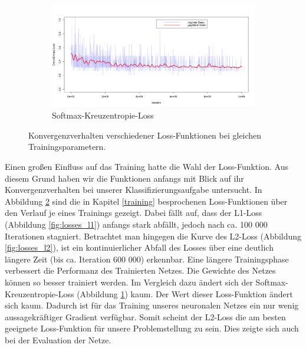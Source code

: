 \begin{figure}[htb!]
\begin{subfigure}[t]{0.49\textwidth}
	\end{subfigure}
	\hfill
	\begin{subfigure}[t]{0.49\textwidth}
		\includegraphics[width=\textwidth]{pics/losses/ce_loss.png}
		\caption{Softmax-Kreuzentropie-Loss}
		\label{fig:losses_ce}
	\end{subfigure}		
	\caption{Konvergenzverhalten verschiedener Loss-Funktionen bei gleichen Trainingsparametern.}
	\label{fig:losses}			
\end{figure}

Einen großen Einfluss auf das Training hatte die Wahl der Loss-Funktion. Aus diesem Grund haben wir die Funktionen anfangs mit Blick auf ihr Konvergenzverhalten bei unserer Klassifizierungsaufgabe untersucht. In Abbildung \ref{fig:losses} sind die in Kapitel \ref{training} besprochenen Loss-Funktionen über den Verlauf je eines Trainings gezeigt. Dabei fällt auf, dass der L1-Loss (Abbildung \ref{fig:losses_l1}) anfangs stark abfällt, jedoch nach ca. 100 000 Iterationen stagniert. Betrachtet man hingegen die Kurve des L2-Loss (Abbildung \ref{fig:losses_l2}), ist ein kontinuierlicher Abfall des Losses über eine deutlich längere Zeit (bis ca. Iteration 600 000) erkennbar. Eine längere Trainingsphase verbessert die Performanz des Trainierten Netzes. Die Gewichte des Netzes können so besser trainiert werden. Im Vergleich dazu ändert sich der Softmax-Kreuzentropie-Loss (Abbildung \ref{fig:losses_ce}) kaum. Der Wert dieser Loss-Funktion ändert sich kaum. Dadurch ist für das Training unseres neuronalen Netzes ein nur wenig aussagekräftiger Gradient verfügbar. Somit scheint der L2-Loss die am besten geeignete Loss-Funktion für unsere Problemstellung zu sein. Dies zeigte sich auch bei der Evaluation der Netze.\\

